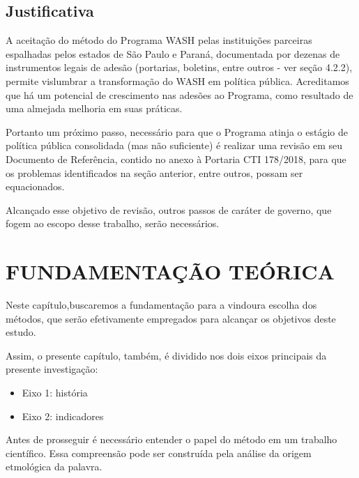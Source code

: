 \section[Justificativa]{Justificativa}\label{Justificativa}
A aceitação do método do Programa WASH pelas instituições parceiras espalhadas pelos estados de São Paulo e Paraná, documentada por dezenas de instrumentos legais de adesão (portarias, boletins, entre outros - ver seção 4.2.2), permite vislumbrar a transformação do WASH em política pública. Acreditamos que há um potencial de crescimento nas adesões ao Programa, como resultado de uma almejada melhoria em suas práticas.

Portanto um próximo passo, necessário para que o Programa atinja o estágio de política pública consolidada (mas não suficiente) é realizar uma revisão em seu Documento de Referência, contido no anexo à Portaria CTI 178/2018, para que os problemas identificados na seção anterior, entre outros, possam ser equacionados.

Alcançado esse objetivo de revisão, outros passos de caráter de governo, que fogem ao escopo desse trabalho, serão necessários.

\chapter[FUNDAMENTAÇÃO TEÓRICA]{FUNDAMENTAÇÃO TEÓRICA}\label{FUNDAMENTAÇÃO TEÓRICA}
Neste capítulo,buscaremos a fundamentação para a vindoura escolha dos métodos, que serão efetivamente empregados para alcançar os objetivos deste estudo.

Assim, o presente capítulo, também, é dividido nos dois eixos principais da presente investigação:


\begin{itemize}
\item Eixo 1: história
\item Eixo 2: indicadores
\end{itemize}

Antes de prosseguir é necessário entender o papel do método em um trabalho científico. Essa compreensão pode ser construída pela análise da origem etmológica da palavra.


\noindent\begin{center}\mbox{\centering{}}\end{center}


